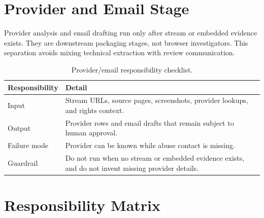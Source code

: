 \section{Provider and Email Stage}

Provider analysis and email drafting run only after stream or embedded evidence
exists. They are downstream packaging stages, not browser investigators. This
separation avoids mixing technical extraction with review communication.



\begin{table}[!htbp]
\centering
\begin{tabularx}{\textwidth}{Q{3.5cm}Y}
\toprule
{}
Responsibility & Detail \\
\midrule
Input & Stream URLs, source pages, screenshots, provider lookups, and rights
context. \\
Output & Provider rows and email drafts that remain subject to human approval. \\
Failure mode & Provider can be known while abuse contact is missing. \\
Guardrail & Do not run when no stream or embedded evidence exists, and do not
invent missing provider details. \\
\bottomrule
\end{tabularx}
\caption{Provider/email responsibility checklist.}
\label{tab:appendix-provider-email-checklist}
\end{table}

\section{Responsibility Matrix}

